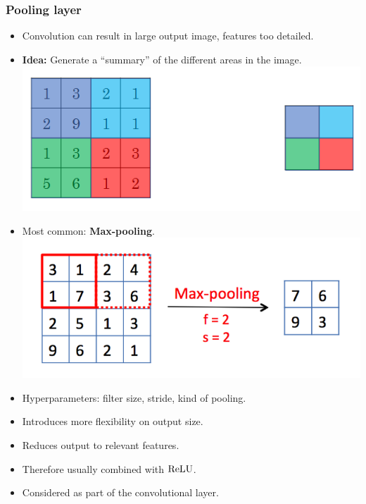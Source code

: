 \documentclass[10pt,hyperref={pdfpagelabels=false}]{beamer}
\begin{document}
\begin{frame}[allowframebreaks]
    \frametitle{Pooling layer}
    \begin{itemize}
        \item Convolution can result in large output image, features too detailed.
        \item {\bf Idea:} Generate a ``summary'' of the different areas in the image.
        \includegraphics[width=.5\textwidth]{figures/pooling1.png}
        \item Most common: {\bf Max-pooling}.
        \includegraphics[width=.5\textwidth]{figures/pooling2.png}
        \framebreak
        \item Hyperparameters: filter size, stride, kind of pooling.
        \item Introduces more flexibility on output size.
        \item Reduces output to relevant features.
        \item Therefore usually combined with $\operatorname{ReLU}$.
        \item Considered as part of the convolutional layer.
    \end{itemize}
\end{frame}
\end{document}
